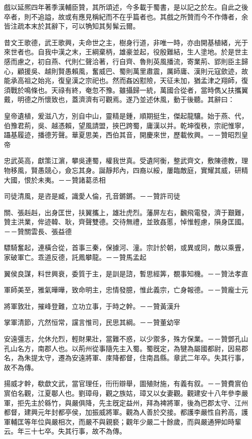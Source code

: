 \begin{pinyinscope}
戲以延熈四年著季漢輔臣贊，其所頌述，今多載于蜀書，是以記之於左。自此之後卒者，則不追謚，故或有應見稱紀而不在乎篇者也。其戲之所贊而今不作傳者，余皆注疏本末於其辭下，可以觕知其髣髴云爾。

昔文王歌德，武王歌興，夫命世之主，樹身行道，非唯一時，亦由開基植緒，光于來世者也。自我中漢之末，王綱棄柄，雄豪並起，役殷難結，生人塗地。於是世主感而慮之，初自燕、代則仁聲洽著，行自齊、魯則英風播流，寄業荊、郢則臣主歸心，顧援吳、越則賢愚賴風，奮威巴、蜀則萬里肅震，厲師庸、漢則元寇歛迹，故能承高祖之始兆，復皇漢之宗祀也。然而姦凶懟險，天征未加，猶孟津之翔師，復須戰於鳴條也。天祿有終，奄忽不豫。雖攝歸一統，萬國合從者，當時儁乂扶攜翼戴，明德之所懷致也，蓋濟濟有可觀焉。遂乃並述休風，動于後聽。其辭曰：

皇帝遺植，爰滋八方，別自中山，靈精是鍾，順期挺生，傑起龍驤。始于燕、代，伯豫君荊，吳、越憑賴，望風請盟，挾巴跨蜀，庸漢以并。乾坤復秩，宗祀惟寧，躡基履迹，播德芳聲。華夏思美，西伯其音，開慶來世，歷載攸興。－－贊昭烈皇帝

忠武英高，獻策江濵，攀吳連蜀，權我世真。受遺阿衡，整武齊文，敷陳德教，理物移風，賢愚競心，僉忘其身。誕靜邦內，四裔以綏，屢臨敵庭，實耀其威，研精大國，恨於未夷。－－贊諸葛丞相

司徒清風，是咨是臧，識愛人倫，孔音鏘鏘。－－贊許司徒

關、張赳赳，出身匡世，扶翼攜上，雄壯虎烈。藩屏左右，飜飛電發，濟于艱難，贊主洪業，侔迹韓、耿，齊聲雙德。交待無禮，並致姦慝，悼惟輕慮，隕身匡國。－－贊關雲長、張益德

驃騎奮起，連橫合從，首事三秦，保據河、潼。宗計於朝，或異或同，敵以乘舋，家破軍亡。乖道反德，託鳳攀龍。－－贊馬孟起

翼侯良謀，料世興衰，委質于主，是訓是諮，暫思經筭，覩事知機。－－贊法孝直

軍師美至，雅氣曄曄，致命明主，忠情發臆，惟此義宗，亡身報德。－－贊龐士元

將軍敦壯，摧峰登難，立功立事，于時之幹。－－贊黃漢升

掌軍清節，亢然恒常，讜言惟司，民思其綱。－－贊董幼宰

安遠彊志，允休允烈，輕財果壯，當難不惑，以少禦多，殊方保業。－－贊鄧孔山孔山名方，南郡人也。以荊州從事隨先主入蜀。蜀旣定，為犍為屬國都尉，因易郡名，為朱提太守，遷為安遠將軍、庲降都督，住南昌縣。章武二年卒。失其行事，故不為傳。

揚威才幹，欷歔文武，當官理任，衎衎辯舉，圖殖財施，有義有叙。－－贊費賔伯賔伯名觀，江夏鄳人也。劉璋母，觀之族姑，璋又以女妻觀。觀建安十八年參李嚴軍，拒先主於緜竹，與嚴俱降，先主旣定益州，拜為裨將軍，後為巴郡太守、江州都督，建興元年封都亭侯，加振威將軍。觀為人善於交接。都護李嚴性自矜高，護軍輔匡等年位與嚴相次，而嚴不與親褻；觀年少嚴二十餘歲，而與嚴通狎如時輩云。年三十七卒。失其行事，故不為傳。


\end{pinyinscope}
